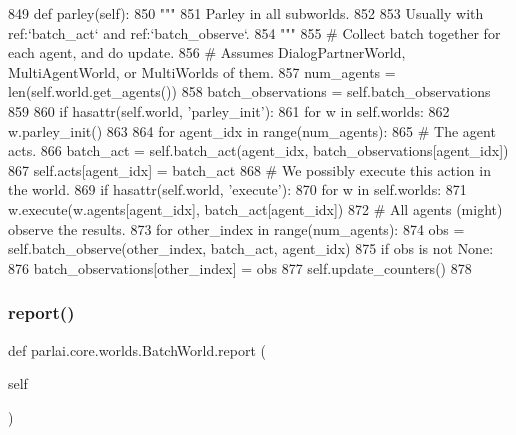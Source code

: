 \begin{DoxyCode}
849     \textcolor{keyword}{def }parley(self):
850         \textcolor{stringliteral}{"""}
851 \textcolor{stringliteral}{        Parley in all subworlds.}
852 \textcolor{stringliteral}{}
853 \textcolor{stringliteral}{        Usually with ref:`batch\_act` and ref:`batch\_observe`.}
854 \textcolor{stringliteral}{        """}
855         \textcolor{comment}{# Collect batch together for each agent, and do update.}
856         \textcolor{comment}{# Assumes DialogPartnerWorld, MultiAgentWorld, or MultiWorlds of them.}
857         num\_agents = len(self.world.get\_agents())
858         batch\_observations = self.batch\_observations
859 
860         \textcolor{keywordflow}{if} hasattr(self.world, \textcolor{stringliteral}{'parley\_init'}):
861             \textcolor{keywordflow}{for} w \textcolor{keywordflow}{in} self.worlds:
862                 w.parley\_init()
863 
864         \textcolor{keywordflow}{for} agent\_idx \textcolor{keywordflow}{in} range(num\_agents):
865             \textcolor{comment}{# The agent acts.}
866             batch\_act = self.batch\_act(agent\_idx, batch\_observations[agent\_idx])
867             self.acts[agent\_idx] = batch\_act
868             \textcolor{comment}{# We possibly execute this action in the world.}
869             \textcolor{keywordflow}{if} hasattr(self.world, \textcolor{stringliteral}{'execute'}):
870                 \textcolor{keywordflow}{for} w \textcolor{keywordflow}{in} self.worlds:
871                     w.execute(w.agents[agent\_idx], batch\_act[agent\_idx])
872             \textcolor{comment}{# All agents (might) observe the results.}
873             \textcolor{keywordflow}{for} other\_index \textcolor{keywordflow}{in} range(num\_agents):
874                 obs = self.batch\_observe(other\_index, batch\_act, agent\_idx)
875                 \textcolor{keywordflow}{if} obs \textcolor{keywordflow}{is} \textcolor{keywordflow}{not} \textcolor{keywordtype}{None}:
876                     batch\_observations[other\_index] = obs
877         self.update\_counters()
878 
\end{DoxyCode}
\mbox{\label{classparlai_1_1core_1_1worlds_1_1BatchWorld_af6ca90db5542bf4a74a122ea04ba8bef}} 
\subsubsection{\texorpdfstring{report()}{report()}}
{\footnotesize\ttfamily def parlai.\+core.\+worlds.\+Batch\+World.\+report (\begin{DoxyParamCaption}\item[{}]{self }\end{DoxyParamCaption})}

